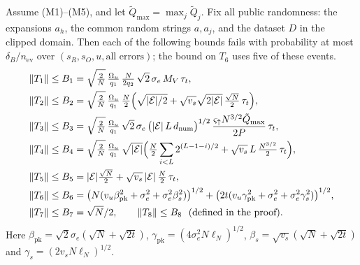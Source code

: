 \begin{proposition}\label{prop:terms}
Assume (M1)--(M5), and let $\tilde Q_{\max}=\max_j\tilde Q_j$. Fix all public randomness: the expansions $a_h$, the common random strings $a,a_j$, and the dataset $D$ in the clipped domain. Then each of the following bounds fails with probability at most $\delta_B/n_{\mathrm{ev}}$ over $(s_R,s_O,u,\text{all errors})$; the bound on $T_6$ uses five of these events.
\begin{align*}
  \nrm{T_1}&\le B_1=\sqrt{\tfrac2N}\,\tfrac{\Omega_u}{q_1}\,\tfrac{N}{2q_2}\,\sqrt2\,\sigma_e\,M_V\,\tau_t ,\\
  \nrm{T_2}&\le B_2=\sqrt{\tfrac2N}\,\tfrac{\Omega_u}{q_1}\,\tfrac N2\Bigl(\sqrt{|\mathcal E|/2}+\sqrt{v_s}\sqrt{2|\mathcal E|}\,\tfrac{\sqrt N}{2}\,\tau_t\Bigr),\\
  \nrm{T_3}&\le B_3=\sqrt{\tfrac2N}\,\tfrac{\Omega_u}{q_1}\,\sqrt2\,\sigma_e\,\bigl(|\mathcal E|\,L\,d_{\mathrm{num}}\bigr)^{1/2}\,\frac{\varsigma_\uparrow N^{3/2}\tilde Q_{\max}}{2P}\,\tau_t ,\\
  \nrm{T_4}&\le B_4=\sqrt{\tfrac2N}\,\tfrac{\Omega_u}{q_1}\,\sqrt{|\mathcal E|}\Bigl(\tfrac N2\sum_{i<L}2^{(L-1-i)/2}+\sqrt{v_s}\,L\,\tfrac{N^{3/2}}{2}\,\tau_t\Bigr),\\
  \nrm{T_5}&\le B_5=|\mathcal E|\tfrac{\sqrt N}{2}+\sqrt{v_s}\,|\mathcal E|\,\tfrac N2\,\tau_t ,\\
  \nrm{T_6}&\le B_6=\bigl(N(v_u\beta_{\mathrm{pk}}^2+\sigma_e^2+\sigma_e^2\beta_s^2)\bigr)^{1/2}+\bigl(2t(v_u\gamma_{\mathrm{pk}}^2+\sigma_e^2+\sigma_e^2\gamma_s^2)\bigr)^{1/2},\\
  \nrm{T_7}&\le B_7=\sqrt N/2,\qquad \nrm{T_8}\le B_8\ \ (\text{defined in the proof}).
\end{align*}
Here $\beta_{\mathrm{pk}}=\sqrt2\sigma_e(\sqrt N+\sqrt{2t})$, $\gamma_{\mathrm{pk}}=(4\sigma_e^2N\ell_N)^{1/2}$, $\beta_s=\sqrt{v_s}(\sqrt N+\sqrt{2t})$ and $\gamma_s=(2v_sN\ell_N)^{1/2}$.
\end{proposition}

